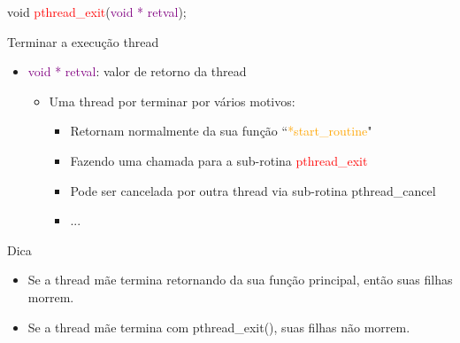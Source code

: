 \documentclass[10pt, xcolor=x11names]{beamer}
\begin{document}
\begin{frame}

void \textcolor{red}{pthread\_exit}(\textcolor{purple}{void * retval});

	\begin{block}{Terminar a execução thread}
		\begin{itemize}
			\item \textcolor{purple}{void * retval}: valor de retorno da thread
				\begin{itemize}
					\item Uma thread por terminar por vários motivos:
						\begin{itemize}
							\item Retornam normalmente da sua função ``\textcolor{orange}{*start\_routine}"
							\item Fazendo uma chamada para a sub-rotina \textcolor{red}{pthread\_exit}
							\item Pode ser cancelada por outra thread via sub-rotina pthread\_cancel
							\item ...
						\end{itemize}
					
				\end{itemize}
		\end{itemize}
	\end{block}

	\begin{alertblock}{Dica}
		\begin{itemize}
			\item Se a thread mãe termina retornando da sua função principal, então suas filhas morrem.
			\item Se a thread mãe termina com pthread\_exit(), suas filhas não morrem.
		\end{itemize}
	\end{alertblock}

\end{frame}

\end{document}
